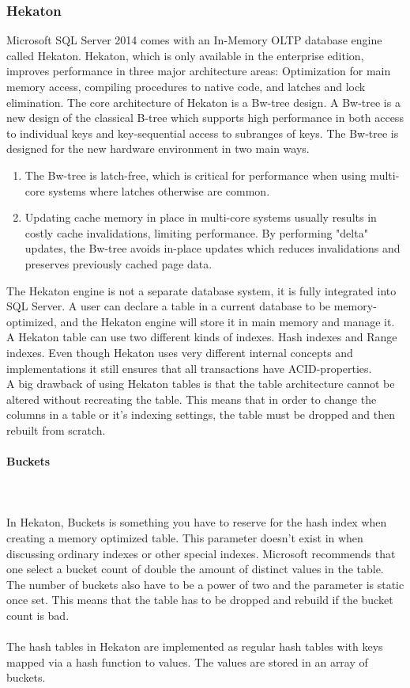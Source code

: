 \documentclass{cslthse-msc}
\begin{document}
\subsubsection{Hekaton}
Microsoft SQL Server 2014 comes with an In-Memory OLTP database engine called Hekaton. Hekaton, which is only available in the enterprise edition, improves performance in three major architecture areas: Optimization for main memory access, compiling procedures to native code, and latches and lock elimination. The core architecture of Hekaton is a Bw-tree design\cite{Levandoski14}. A Bw-tree is a new design of the classical B-tree which supports high performance in both access to individual keys and key-sequential access to subranges of keys. The Bw-tree is designed for the new hardware environment in two main ways. 
\begin{enumerate}
\item The Bw-tree is latch-free, which is critical for performance when using multi-core systems where latches otherwise are common.
\item Updating cache memory in place in multi-core systems usually results in costly cache invalidations, limiting performance. By performing "delta" updates, the Bw-tree avoids in-place updates which reduces invalidations and preserves previously cached page data.
\end{enumerate} 
The Hekaton engine is not a separate database system, it is fully integrated into SQL Server. A user can declare a table in a current database to be memory-optimized, and the Hekaton engine will store it in main memory and manage it. A Hekaton table can use two different kinds of indexes. Hash indexes and Range indexes.  Even though Hekaton uses very different internal concepts and implementations it still ensures that all transactions have ACID-properties. \\
A big drawback of using Hekaton tables is that the table architecture cannot be altered without recreating the table. This means that in order to change the columns in a table or it's indexing settings, the table must be dropped and then rebuilt from scratch.

\paragraph*{Buckets}\mbox{}\\\\
In Hekaton, Buckets is something you have to reserve for the hash index when creating a memory optimized table. This parameter doesn't exist in when discussing ordinary indexes or other special indexes. Microsoft recommends that one select a bucket count of double the amount of distinct values in the table. The number of buckets also have to be a power of two and the parameter is static once set. This means that the table has to be dropped and rebuild if the bucket count is bad. \\\\
The hash tables in Hekaton are implemented as regular hash tables with keys mapped via a hash function to values. The values are stored in an array of buckets\cite{Barbarin14}. 
\end{document}
